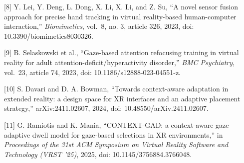\documentclass[
  10pt,
]{article}
\begin{document}
{[}8{]} Y. Lei, Y. Deng, L. Dong, X. Li, X. Li, and Z. Su, ``A novel
sensor fusion approach for precise hand tracking in virtual
reality-based human-computer interaction,'' \emph{Biomimetics}, vol.~8,
no. 3, article 326, 2023, doi: 10.3390/biomimetics8030326.

{[}9{]} B. Selaskowski et al., ``Gaze-based attention refocusing
training in virtual reality for adult attention-deficit/hyperactivity
disorder,'' \emph{BMC Psychiatry}, vol.~23, article 74, 2023, doi:
10.1186/s12888-023-04551-z.

{[}10{]} S. Davari and D. A. Bowman, ``Towards context-aware adaptation
in extended reality: a design space for XR interfaces and an adaptive
placement strategy,'' arXiv:2411.02607, 2024, doi:
10.48550/arXiv.2411.02607.

{[}11{]} G. Ramiotis and K. Mania, ``CONTEXT-GAD: a context-aware gaze
adaptive dwell model for gaze-based selections in XR environments,'' in
\emph{Proceedings of the 31st ACM Symposium on Virtual Reality Software
and Technology (VRST '25)}, 2025, doi: 10.1145/3756884.3766048.
\end{document}
